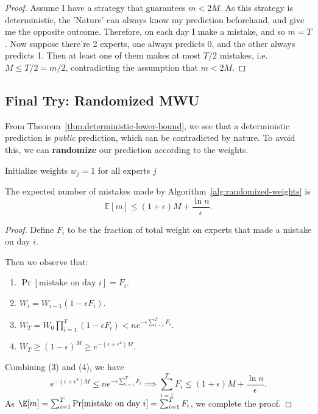 \begin{proof}
  Assume I have a strategy that guarantees $m < 2M$. As this strategy is deterministic, the 'Nature' can always know my prediction beforehand, and give me the opposite outcome. Therefore, on each day I make a mistake, and so $m = T$.
  Now suppose there're 2 experts, one always predicts 0, and the other always predicts 1. Then at least one of them makes at most $T/2$ mistakes, i.e. $M \leq T/2 = m/2$, contradicting the assumption that $m < 2M$.
\end{proof}

\subsection{Final Try: Randomized MWU}

From Theorem~\ref{thm:deterministic-lower-bound}, we see that a deterministic prediction is \textit{public} prediction, which can be contradicted by nature. To avoid this, we can \textbf{randomize} our prediction according to the weights.

\begin{algorithm}
    \caption{Randomized MWU Algorithm}
    \label{alg:randomized-weights}
    Initialize weights $w_j = 1$ for all experts $j$\;
\end{algorithm}

\begin{theorem}
  The expected number of mistakes made by Algorithm~\ref{alg:randomized-weights} is
  \[ \mathbb{E}[m] \leq (1+\epsilon) M + \frac{\ln n}{\epsilon}. \]
\end{theorem}

\begin{proof}
  Define $F_i$ to be the fraction of total weight on experts that made a mistake on day $i$.

  Then we observe that:
  \begin{enumerate}
    \item $\Pr[\text{mistake on day } i] = F_i$.
    \item $W_i = W_{i-1} (1 - \epsilon F_i)$.
    \item $W_T = W_0 \prod_{i=1}^T (1 - \epsilon F_i) < n e^{-\epsilon \sum_{i=1}^T F_i}$.
    \item $W_T \geq (1 - \epsilon)^M \geq e^{-(\epsilon + \epsilon^2) M}$.
  \end{enumerate}
  Combining (3) and (4), we have
  \[ e^{-(\epsilon + \epsilon^2) M} \leq n e^{-\epsilon \sum_{i=1}^T F_i} \implies \sum_{i=1}^T F_i \leq (1+\epsilon) M + \frac{\ln n}{\epsilon}. \]
  As $\E[m] = \sum_{i=1}^T \Pr[\text{mistake on day } i] = \sum_{i=1}^T F_i$, we complete the proof.
\end{proof}
